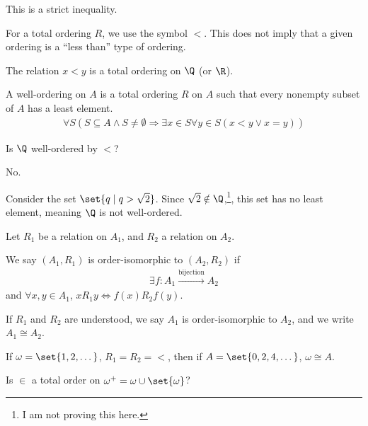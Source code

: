 \documentclass[10pt]{mypackage}
\begin{document}
\begin{remark}
  This is a strict inequality.
\end{remark}
\begin{notation}
  For a total ordering $R$, we use the symbol $<$. This does not imply that a given ordering is a ``less than'' type of ordering.
\end{notation}
\begin{example}
  The relation $x < y$ is a total ordering on $\Q$ (or $\R$).
\end{example}
\begin{definition}
  A well-ordering on $A$ is a total ordering $R$ on $A$ such that every nonempty subset of $A$ has a least element.
  \begin{align*}
    \forall S\left(S\subseteq A \wedge S\neq \emptyset \Rightarrow \exists x\in S\forall y\in S \left(x < y \vee x = y\right)\right)
  \end{align*}
\end{definition}
\begin{question}
  Is $\Q$ well-ordered by $<$?
\end{question}
\begin{answer}
  No.\newline

  Consider the set $\set{q\mid q > \sqrt{2}}$. Since $\sqrt{2}\notin \Q$,\footnote{I am not proving this here.}, this set has no least element, meaning $\Q$ is not well-ordered.
\end{answer}
\begin{definition}
  Let $R_1$ be a relation on $A_1$, and $R_2$ a relation on $A_2$.\newline

  We say $\left(A_1,R_1\right)$ is order-isomorphic to $\left(A_2,R_2\right)$ if
  \begin{align*}
    \exists f: A_1\xrightarrow{\text{bijection}} A_2
  \end{align*}
  and $\forall x,y\in A_1$, $xR_1y \Leftrightarrow f(x)R_2f(y)$.
\end{definition}
\begin{remark}
  If $R_1$ and $R_2$ are understood, we say $A_1$ is order-isomorphic to $A_2$, and we write $A_1 \cong A_2$.
\end{remark}
\begin{example}
  If $\omega = \set{1,2,\dots}$, $R_1 = R_2 = <$, then if $A = \set{0,2,4,\dots}$, $\omega \cong A$.
\end{example}
\begin{question}
  Is $\in$ a total order on $\omega^{+} = \omega \cup \set{\omega}$?
\end{question}
\end{document}
